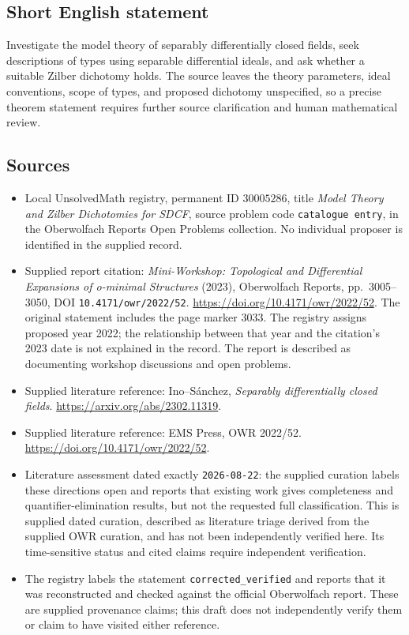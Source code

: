 \documentclass[11pt]{article}
\begin{document}
\subsection{Short English statement}
Investigate the model theory of separably differentially closed fields, seek descriptions of types using separable differential ideals, and ask whether a suitable Zilber dichotomy holds. The source leaves the theory parameters, ideal conventions, scope of types, and proposed dichotomy unspecified, so a precise theorem statement requires further source clarification and human mathematical review.
\subsection{Sources}
\begin{itemize}
\item Local UnsolvedMath registry, permanent ID \(30005286\), title \emph{Model Theory and Zilber Dichotomies for SDCF}, source problem code \texttt{catalogue entry}, in the Oberwolfach Reports Open Problems collection. No individual proposer is identified in the supplied record.
\item Supplied report citation: \emph{Mini-Workshop: Topological and Differential Expansions of o-minimal Structures} (2023), Oberwolfach Reports, pp.~3005--3050, DOI \texttt{10.4171/owr/2022/52}. \url{https://doi.org/10.4171/owr/2022/52}. The original statement includes the page marker 3033. The registry assigns proposed year 2022; the relationship between that year and the citation's 2023 date is not explained in the record. The report is described as documenting workshop discussions and open problems.
\item Supplied literature reference: Ino--Sánchez, \emph{Separably differentially closed fields}. \url{https://arxiv.org/abs/2302.11319}.
\item Supplied literature reference: EMS Press, OWR 2022/52. \url{https://doi.org/10.4171/owr/2022/52}.
\item Literature assessment dated exactly \texttt{2026-08-22}: the supplied curation labels these directions open and reports that existing work gives completeness and quantifier-elimination results, but not the requested full classification. This is supplied dated curation, described as literature triage derived from the supplied OWR curation, and has not been independently verified here. Its time-sensitive status and cited claims require independent verification.
\item The registry labels the statement \texttt{corrected\_verified} and reports that it was reconstructed and checked against the official Oberwolfach report. These are supplied provenance claims; this draft does not independently verify them or claim to have visited either reference.
\end{itemize}
\end{document}
